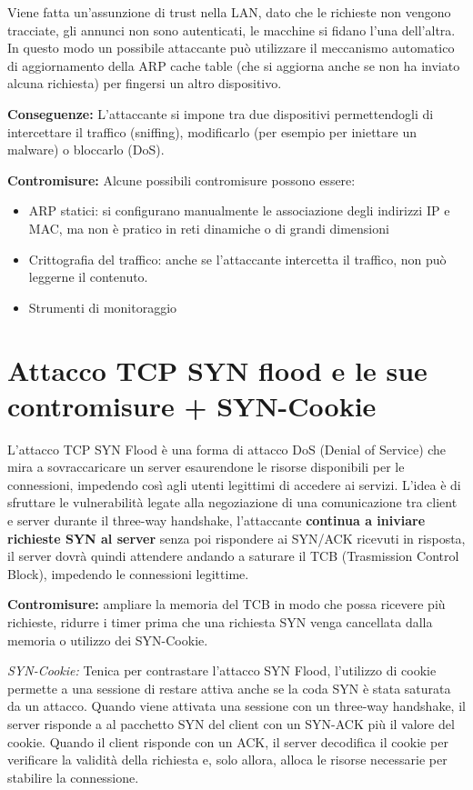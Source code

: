 \documentclass{report}
\begin{document}
\noindent Viene fatta un'assunzione di trust nella LAN, dato che le richieste non vengono tracciate, gli annunci non sono autenticati, le macchine si fidano l'una dell'altra.
In questo modo un possibile attaccante può utilizzare il meccanismo automatico di aggiornamento della ARP cache table (che si aggiorna anche se non ha inviato alcuna richiesta) per fingersi un altro dispositivo.

\noindent \textbf{Conseguenze:} L'attaccante si impone tra due dispositivi permettendogli di intercettare il traffico (sniffing), modificarlo (per esempio per iniettare un malware) o
bloccarlo (DoS).

\noindent \textbf{Contromisure:} Alcune possibili contromisure possono essere:
\begin{itemize}
    \item ARP statici: si configurano manualmente le associazione degli indirizzi IP e MAC, ma non è pratico in reti dinamiche o di grandi dimensioni
    \item Crittografia del traffico: anche se l'attaccante intercetta il traffico, non può leggerne il contenuto.
    \item Strumenti di monitoraggio 
\end{itemize}

\section{Attacco TCP SYN flood e le sue contromisure + SYN-Cookie}
\noindent L'attacco TCP SYN Flood è una forma di attacco DoS (Denial of Service) che mira a sovraccaricare un server esaurendone le risorse disponibili per le connessioni, impedendo così agli utenti legittimi di accedere ai servizi.
L'idea è di sfruttare le vulnerabilità legate alla negoziazione di una comunicazione tra client e server durante il three-way handshake, l'attaccante \textbf{continua a iniviare richieste SYN al server} senza poi rispondere ai SYN/ACK ricevuti in risposta,
il server dovrà quindi attendere andando a saturare il TCB (Trasmission Control Block), impedendo le connessioni legittime.

\noindent \textbf{Contromisure:} ampliare la memoria del TCB in modo che possa ricevere più richieste, ridurre i timer prima che una richiesta SYN venga cancellata dalla memoria o utilizzo dei SYN-Cookie.

\noindent \textit{SYN-Cookie:} Tenica per contrastare l'attacco SYN Flood, l'utilizzo di cookie permette a una sessione di restare attiva anche se la coda SYN è stata saturata da un attacco.
Quando viene attivata una sessione con un three-way handshake, il server risponde a al pacchetto SYN del client con un SYN-ACK più il valore del cookie.
Quando il client risponde con un ACK, il server decodifica il cookie per verificare la validità della richiesta e, solo allora, alloca le risorse necessarie per stabilire la connessione.
\end{document}
